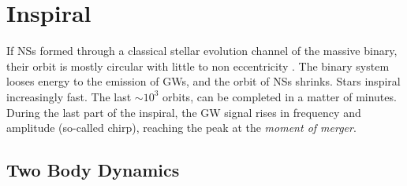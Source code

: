 







\section{Inspiral}

If \acp{NS} formed through a classical stellar evolution channel of the massive binary, 
their orbit is mostly circular with little to non eccentricity \citep{Aasi:2013wya}. 
%
The binary system looses energy to the emission of \acp{GW}, and the orbit of \acp{NS} 
shrinks. Stars inspiral increasingly fast. The last ${\sim}10^3$ orbits, can be completed in 
a matter of minutes. During the last part of the inspiral, the \ac{GW} signal rises in 
frequency and amplitude (so-called chirp), reaching the peak at the \textit{moment of merger}.

\subsection{Two Body Dynamics}

